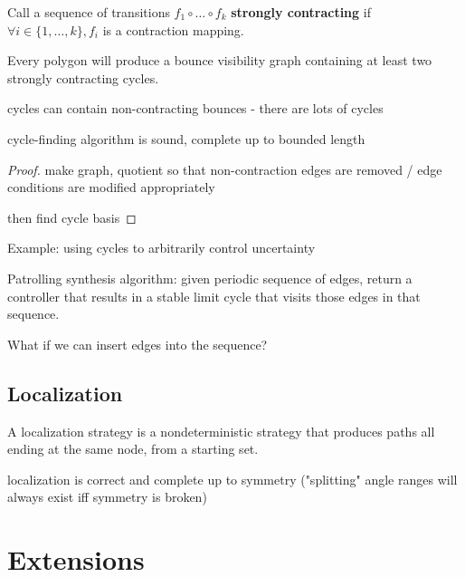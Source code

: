 \documentclass[]{styles/svproc}  %
\begin{document}
\begin{definition}
Call a sequence of transitions $f_1 \circ \ldots \circ f_k$ \textbf{strongly
contracting} if $\forall i \in \{1, \ldots, k\}, f_i$ is a contraction mapping.
\end{definition}

\begin{corollary}
Every polygon will produce a bounce visibility graph containing at least two
strongly contracting cycles.
\end{corollary}



\begin{lemma}
cycles can contain non-contracting bounces - there are lots of cycles
\end{lemma}


\begin{theorem}
cycle-finding algorithm is sound, complete up to bounded length
\end{theorem}

\begin{proof}
make graph, quotient so that non-contraction edges are removed / edge conditions
are modified appropriately

then find cycle basis
\end{proof}

Example: using cycles to arbitrarily control uncertainty


Patrolling synthesis algorithm: given periodic sequence of edges, return a controller that
results in a stable limit cycle that visits those edges in that sequence.

What if we can insert edges into the sequence?

\subsection{Localization}

\begin{definition}
A localization strategy is a nondeterministic strategy that produces paths all
ending at the same node, from a starting set.
\end{definition}

\begin{theorem}
localization is correct and complete up to symmetry ("splitting" angle ranges
will always exist iff symmetry is broken)
\end{theorem}


\section{Extensions}
\end{document}

